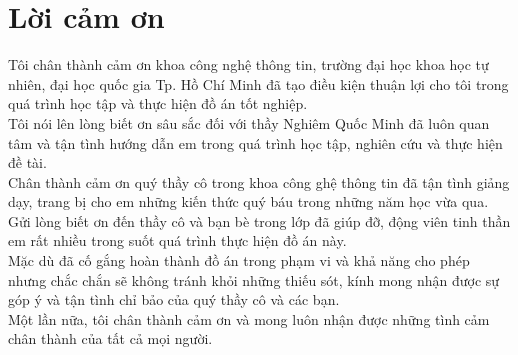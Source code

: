 \chapter*{Lời cảm ơn}
\label{thanks}

\hspace{10 mm}Tôi chân thành cảm ơn khoa công nghệ thông tin, trường đại học khoa học tự nhiên, đại học quốc gia Tp. Hồ Chí Minh đã tạo điều kiện thuận lợi cho tôi trong quá trình học tập và thực hiện đồ án tốt nghiệp.\\
\hspace*{10 mm}Tôi nói lên lòng biết ơn sâu sắc đối với thầy Nghiêm Quốc Minh đã luôn quan tâm và tận tình hướng dẫn em trong quá trình học tập, nghiên cứu và thực hiện đề tài.\\
\hspace*{10 mm}Chân thành cảm ơn quý thầy cô trong khoa công ghệ thông tin đã tận tình giảng dạy, trang bị cho em những kiến thức quý báu trong những năm học vừa qua.\\
\hspace*{10 mm}Gửi lòng biết ơn đến thầy cô và bạn bè trong lớp đã giúp đỡ, động viên tinh thần em rất nhiều trong suốt quá trình thực hiện đồ án này. \\
\hspace*{10 mm}Mặc dù đã cố gắng hoàn thành đồ án trong phạm vi và khả năng cho phép nhưng chắc chắn sẽ không tránh khỏi những thiếu sót, kính mong nhận được sự góp ý và tận tình chỉ bảo của quý thầy cô và các bạn.\\
\hspace*{10 mm}Một lần nữa, tôi chân thành cảm ơn và mong luôn nhận được những tình cảm chân thành của tất cả mọi người.\\